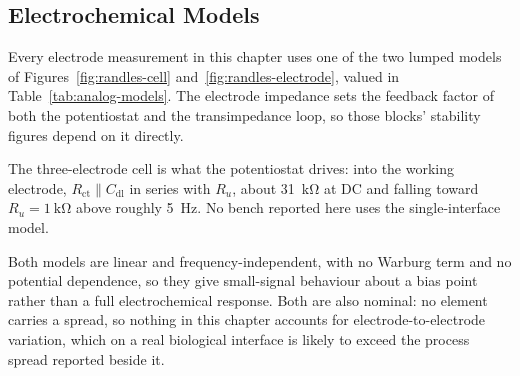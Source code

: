 %

\subsection{Electrochemical Models}\label{ss:analog-models}

Every electrode measurement in this chapter uses one of the two lumped models of
Figures~\ref{fig:randles-cell} and~\ref{fig:randles-electrode}, valued in
Table~\ref{tab:analog-models}. The electrode impedance sets the feedback factor
of both the potentiostat and the transimpedance loop, so those blocks' stability
figures depend on it directly.

The three-electrode cell is what the potentiostat drives: into the working
electrode, \(R_{\mathrm{ct}} \parallel C_{\mathrm{dl}}\) in series with
\(R_u\), about \SI{31}{\kilo\ohm} at DC and falling toward
\(R_u = \SI{1}{\kilo\ohm}\) above roughly \SI{5}{\hertz}. No bench reported here
uses the single-interface model.

Both models are linear and frequency-independent, with no Warburg term and no
potential dependence, so they give small-signal behaviour about a bias point
rather than a full electrochemical response. Both are also nominal: no element
carries a spread, so nothing in this chapter accounts for electrode-to-electrode
variation, which on a real biological interface is likely to exceed the process
spread reported beside it.

